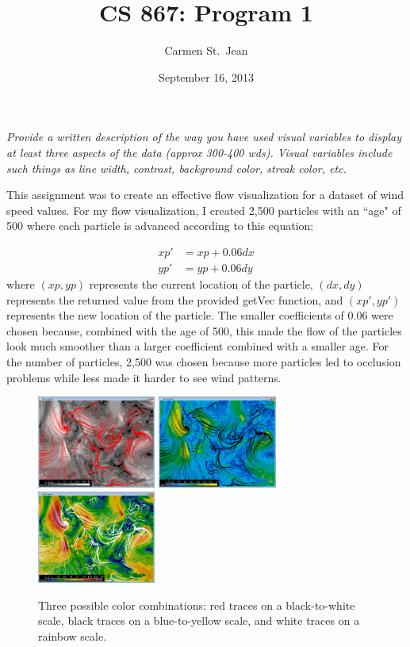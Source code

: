 \documentclass{article} %
\begin{document}
\title{CS 867: Program 1}
\date{September 16, 2013}
\author{Carmen St.\ Jean}

\maketitle

\textit{Provide a written description of the way you have used visual variables to display at least three aspects of the data (approx 300-400 wds). Visual variables include such things as line width, contrast, background color, streak color, etc.}

This assignment was to create an effective flow visualization for a dataset of wind speed values.  For my flow visualization, I created 2,500 particles with an ``age" of 500 where each particle is advanced according to this equation:

\begin{align*} 
xp' &= xp + 0.06 dx \\
yp' &= yp + 0.06 dy
\end{align*}
where $(xp, yp)$ represents the current location of the particle, $(dx, dy)$ represents the returned value from the provided getVec function, and $(xp', yp')$ represents the new location of the particle.  The smaller coefficients of 0.06 were chosen because, combined with the age of 500, this made the flow of the particles look much smoother than a larger coefficient combined with a smaller age.  For the number of particles, 2,500 was chosen because more particles led to occlusion problems while less made it harder to see wind patterns.

\begin{figure}[htb]
   \centering
   \includegraphics[height=1.2in]{images/basic_bw_red.eps}
   \includegraphics[height=1.2in]{images/basic_by_black.eps}
   \includegraphics[height=1.2in]{images/basic_rainbow_white.eps}
    \caption{Three possible color combinations: red traces on a black-to-white scale, black traces on a blue-to-yellow scale, and white traces on a rainbow scale.}
   \label{fig:colors}
\end{figure}
\end{document}
